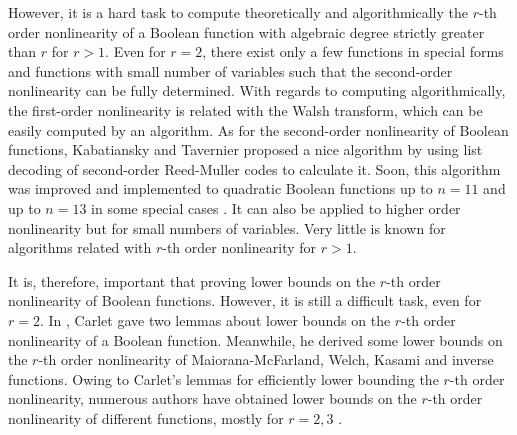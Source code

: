 \documentclass{article}
\newcommand{\0}{\textbf{0}}
\newcommand{\1}{\textbf{1}}
\theoremstyle{plain}
\begin{document}
    However, it is a hard task to compute theoretically and algorithmically the $r$-th order nonlinearity of a Boolean function with algebraic degree strictly greater than $r$ for $r>1$.
    Even for $r=2$, there exist only a few functions in special forms and functions with small number of variables such that the second-order nonlinearity can be fully determined.
    With regards to computing algorithmically, the first-order nonlinearity is related with the Walsh transform, which can be easily computed by an algorithm.
    As for the second-order nonlinearity of Boolean functions, Kabatiansky and Tavernier \cite{KabatianskyT2005listdecoding_RM_2_n} proposed a nice algorithm by using list decoding of second-order Reed-Muller codes to calculate it.
    Soon, this algorithm was improved and implemented to quadratic Boolean functions up to $n=11$ and up to $n=13$ in some special cases \cite{FourquetT2008improved_listdecoding_RM_2_n}. 
    It can also be applied to higher order nonlinearity but for small numbers of variables. 
    Very little is known for algorithms related with $r$-th order nonlinearity for $r>1$. 

    It is, therefore, important that proving lower bounds on the $r$-th order nonlinearity of Boolean functions. 
    However, it is still a difficult task, even for $r=2$. 
    In \cite{Carlet2008lowbound_NL_profile}, Carlet gave two lemmas about lower bounds on the $r$-th order nonlinearity of a Boolean function.
    Meanwhile, he derived some lower bounds on the $r$-th order nonlinearity of Maiorana-McFarland, Welch, Kasami and inverse functions.
    Owing to Carlet's lemmas for efficiently lower bounding the $r$-th order nonlinearity, numerous authors have obtained lower bounds on the $r$-th order nonlinearity of different functions, mostly for $r=2,3$ \cite{YanT2020NL_2,Liu2023NL_2,TangYZZ2020NL_2bent,SihemKJ2020NL_2cubic,SunW2009NL_2,SarkarG2009NL_2MM,GangopadhyayST2010NL_2,GodeG2010NL_3Kasami,SunW2011NL_2,TangCT2013NL_2bent,Singh2014NL_3_biquadratic,GaoT2017NL_2_MM}.
    
\end{document}
